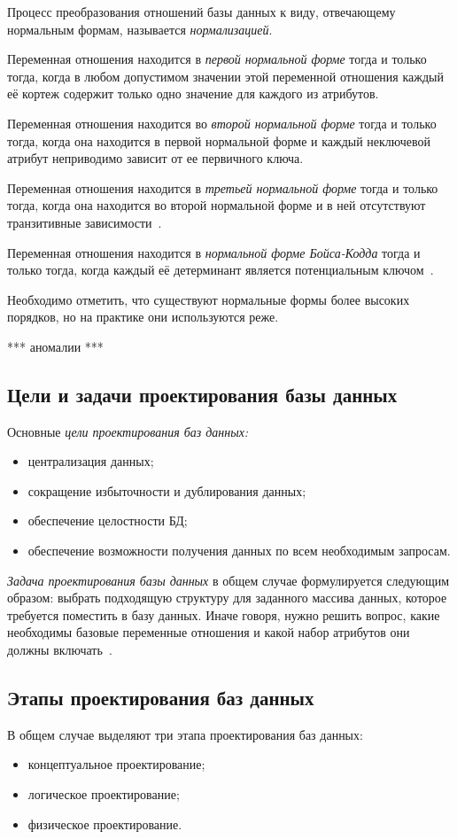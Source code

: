Процесс преобразования отношений базы данных к виду, отвечающему нормальным формам,
называется \textit{нормализацией}.

Переменная отношения находится в \textit{первой нормальной форме} тогда и только
тогда, когда в любом допустимом значении этой переменной отношения каждый её кортеж
содержит только одно значение для каждого из атрибутов.

Переменная отношения находится во \textit{второй нормальной форме} тогда и только тогда,
когда она находится в первой нормальной форме и каждый неключевой атрибут
неприводимо зависит от ее первичного ключа.

Переменная отношения находится в \textit{третьей нормальной форме} тогда и только
тогда, когда она находится во второй нормальной форме и в ней отсутствуют транзитивные
зависимости~\cite{date05}.

Переменная отношения находится в \textit{нормальной форме Бойса-Кодда} тогда и только тогда,
когда каждый её детерминант является потенциальным ключом~\cite{konnolli03}.

Необходимо отметить, что существуют нормальные формы более высоких порядков, но
на практике они используются реже.

*** аномалии ***

\subsection{Цели и задачи проектирования базы данных}
\label{sub:db_structure_aims}

Основные \textit{цели проектирования баз данных:}
\begin{itemize}
  \item централизация данных;
  \item сокращение избыточности и дублирования данных;
  \item обеспечение целостности БД;
  \item обеспечение возможности получения данных по всем необходимым запросам.
\end{itemize}

\textit{Задача проектирования базы данных} в общем случае формулируется следующим образом: выбрать
подходящую структуру для заданного массива данных, которое требуется поместить в базу данных.
Иначе говоря, нужно решить вопрос, какие необходимы базовые переменные отношения и какой
набор атрибутов они должны включать~\cite{date05}.

\subsection{Этапы проектирования баз данных}
\label{sub:db_structure_stages}
В общем случае выделяют три этапа проектирования баз данных:
\begin{itemize}
  \item концептуальное проектирование;
  \item логическое проектирование;
  \item физическое проектирование.
\end{itemize}

